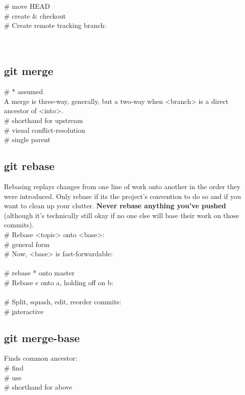  \# move HEAD \\
 \# create \& checkout \\
\# Create remote tracking branch:\\
 \\
 \\



\subsection*{git merge}
 \# * assumed \\
A merge is three-way, generally, but a two-way  when <branch> is a direct ancestor of <into>.\\ 
 \# shorthand for upstream \\
 \# visual conflict-resolution \\
 \# single parent \\ 



\subsection*{git rebase}
Rebasing replays changes from one line of work onto another in the order they were introduced.  
Only rebase if it\textquotesingle s the project's convention to do so and if you want to clean up your clutter. \textbf{Never rebase anything you've pushed} (although it's technically still okay if no one else will base their work on those commits).\\
\# Rebase <topic> onto <base>:\\ 
 \# general form \\
\# Now, <base> is fast-forwardable:\\
\\
 \# rebase * onto master\\
\# Rebase c onto a, holding off on b: \\
 \\
\# Split, squash, edit, reorder commits: \\
 \# \underline{i}nteractive \\


\subsection*{git merge-base}
Finds common ancestor:\\
 \# find \\
 \# use \\
 \# shorthand for above \\

